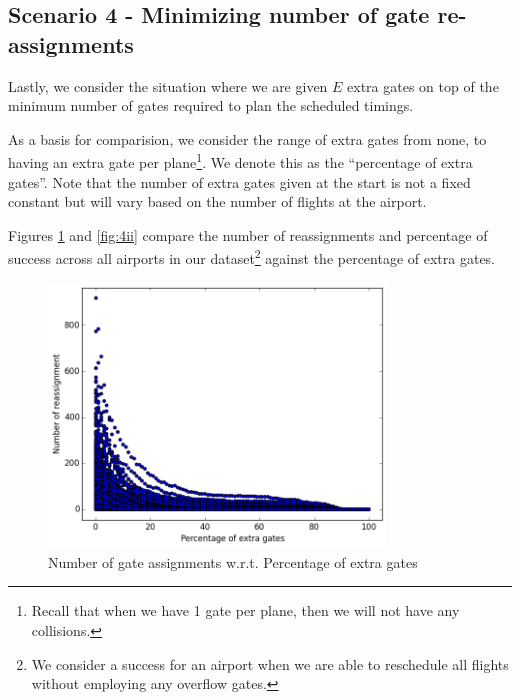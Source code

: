 \documentclass[12pt, a4paper]{report}
\begin{document}




\subsection{Scenario 4 - Minimizing number of gate re-assignments}
Lastly, we consider the situation where we are given $E$ extra gates on top of the minimum number of gates required to plan the scheduled timings.

As a basis for comparision, we consider the range of extra gates from none, to having an extra gate per plane\footnote{Recall that when we have 1 gate per plane, then we will not have any collisions.}. We denote this as the ``percentage of extra gates''. Note that the number of extra gates given at the start is not a fixed constant but will vary based on the number of flights at the airport.

Figures \ref{fig:4i} and \ref{fig:4ii} compare the number of reassignments and percentage of success across all airports in our dataset\footnote{We consider a success for an airport when we are able to reschedule all flights without employing any overflow gates.} against the percentage of extra gates.

\begin{figure}[h!]
\centering
\includegraphics[width=0.8\textwidth]{../graph/4i.png}
\caption{Number of gate assignments w.r.t. Percentage of extra gates}
\label{fig:4i}
\end{figure}
\end{document}
